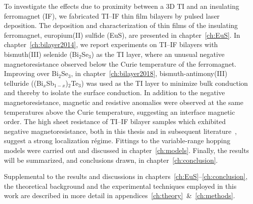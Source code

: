 To investigate the effects due to proximity between a 3D TI and an insulating ferromagnet (IF), we fabricated TI--IF thin film bilayers by pulsed laser deposition. The deposition and characterization of thin films of the insulating ferromagnet, europium(II) sulfide (EuS), are presented in chapter~\ref{ch:EuS}. In chapter~\ref{ch:bilayer2014}, we report experiments on TI--IF bilayers with bismuth(III) selenide (Bi$_2$Se$_3$) as the TI layer, where an unusual negative magnetoresistance observed below the Curie temperature of the ferromagnet. Improving over Bi$_2$Se$_3$, in chapter~\ref{ch:bilayer2018}, bismuth-antimony(III) telluride ((Bi$_x$Sb$_{1-x}$)$_2$Te$_3$) was used as the TI layer to minimize bulk conduction and thereby to isolate the surface conduction. In addition to the negative magnetoresistance, magnetic and resistive anomalies were observed at the same temperatures above the Curie temperature, suggesting an interface magnetic order. The high sheet resistance of TI--IF bilayer samples which exhibited negative magnetoresistance, both in this thesis and in subsequent literature~\cite{Samarth2017, Tian2016}, suggest a strong localization r\'egime. Fittings to the variable-range hopping models were carried out and discussed in chapter~\ref{ch:models}. Finally, the results will be summarized, and conclusions drawn, in chapter~\ref{ch:conclusion}.

Supplemental to the results and discussions in chapters~\ref{ch:EuS}--\ref{ch:conclusion}, the theoretical background and the experimental techniques employed in this work are described in more detail in appendices~\ref{ch:theory}~\&~\ref{ch:methods}.